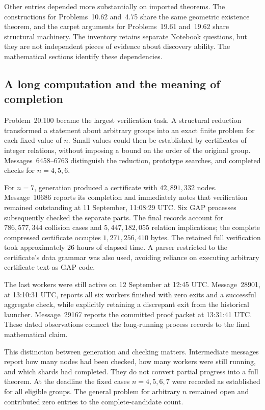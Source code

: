 Other entries depended more substantially on imported theorems.
The constructions for Problems~10.62 and~4.75 share the same geometric
existence theorem, and the carpet arguments for Problems~19.61 and~19.62
share structural machinery. The inventory retains separate Notebook
questions, but they are not independent pieces of evidence about
discovery ability. The mathematical sections identify these dependencies.

\subsection{A long computation and the meaning of completion}

Problem~20.100 became the largest verification task. A structural
reduction transformed a statement about arbitrary groups into an exact
finite problem for each fixed value of \(n\). Small values could then be
established by certificates of integer relations, without imposing a
bound on the order of the original group. Messages~6458--6763 distinguish
the reduction, prototype searches, and completed checks for
\(n=4,5,6\).

For \(n=7\), generation produced a certificate with \(42{,}891{,}332\)
nodes. Message~10686 reports its completion and immediately notes that
verification remained outstanding at 11 September, 11:08:29 UTC.
Six GAP processes subsequently
checked the separate parts. The final records account for
\(786{,}577{,}344\) collision cases and \(5{,}447{,}182{,}055\)
relation implications; the complete compressed certificate occupies
\(1{,}271{,}256{,}410\) bytes. The retained full verification took
approximately 26 hours of elapsed time. A parser restricted to the
certificate's data grammar was also used, avoiding reliance on
executing arbitrary certificate text as GAP code.

The last workers were still active on 12 September at 12:45 UTC.
Message~28901, at 13:10:31 UTC, reports all six workers finished with
zero exits and a successful aggregate check, while explicitly retaining
a discrepant exit from the historical launcher. Message~29167 reports
the committed proof packet at 13:31:41 UTC. These dated observations
connect the long-running process records to the final mathematical claim.

This distinction between generation and checking matters. Intermediate
messages report how many nodes had been checked, how many workers were
still running, and which shards had completed. They do not convert
partial progress into a full theorem. At the deadline the fixed cases
\(n=4,5,6,7\) were recorded as established for all eligible groups.
The general problem for arbitrary \(n\) remained open and contributed
zero entries to the complete-candidate count.


